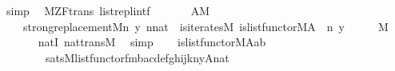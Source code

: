 \begin{isabellebody}
\ simp\isanewline
{}\isamarkupfalse%
%
\endisatagproof
{\isafoldproof}%
%
\isadelimproof
\isanewline
%
\endisadelimproof
\isanewline
\isanewline
{}\isamarkupfalse%
\ {\isacharparenleft}{\kern0pt}\ M{\isacharunderscore}{\kern0pt}ZF{\isacharunderscore}{\kern0pt}trans{\isacharparenright}{\kern0pt}\ list{\isacharunderscore}{\kern0pt}repl{}{\isacharunderscore}{\kern0pt}intf{\isacharcolon}{\kern0pt}\isanewline
\ \ \isanewline
\ \ \ \ {\isachardoublequoteopen}A{\isasymin}M{\isachardoublequoteclose}\isanewline
\ \ \isanewline
\ \ \ \ {\isachardoublequoteopen}strong{\isacharunderscore}{\kern0pt}replacement{\isacharparenleft}{\kern0pt}{\isacharhash}{\kern0pt}{\isacharhash}{\kern0pt}M{\isacharcomma}{\kern0pt}{\isasymlambda}n\ y{\isachardot}{\kern0pt}\ n{\isasymin}nat\ {\isacharampersand}{\kern0pt}\ is{\isacharunderscore}{\kern0pt}iterates{\isacharparenleft}{\kern0pt}{\isacharhash}{\kern0pt}{\isacharhash}{\kern0pt}M{\isacharcomma}{\kern0pt}\ is{\isacharunderscore}{\kern0pt}list{\isacharunderscore}{\kern0pt}functor{\isacharparenleft}{\kern0pt}{\isacharhash}{\kern0pt}{\isacharhash}{\kern0pt}M{\isacharcomma}{\kern0pt}A{\isacharparenright}{\kern0pt}{\isacharcomma}{\kern0pt}\ {}{\isacharcomma}{\kern0pt}\ n{\isacharcomma}{\kern0pt}\ y{\isacharparenright}{\kern0pt}{\isacharparenright}{\kern0pt}{\isachardoublequoteclose}\isanewline
%
\isadelimproof
%
\endisadelimproof
%
\isatagproof
{}\isamarkupfalse%
\ {\isacharminus}{\kern0pt}\isanewline
\ \ \isamarkupfalse%
\ {\isachardoublequoteopen}{}{\isasymin}M{\isachardoublequoteclose}\isanewline
\ \ \ \ \isamarkupfalse%
\ \ nat{\isacharunderscore}{\kern0pt}{}I\ nat{\isacharunderscore}{\kern0pt}trans{\isacharunderscore}{\kern0pt}M\ \isamarkupfalse%
\ simp\isanewline
\ \ \isamarkupfalse%
\ {\isachardoublequoteopen}is{\isacharunderscore}{\kern0pt}list{\isacharunderscore}{\kern0pt}functor{\isacharparenleft}{\kern0pt}{\isacharhash}{\kern0pt}{\isacharhash}{\kern0pt}M{\isacharcomma}{\kern0pt}A{\isacharcomma}{\kern0pt}a{\isacharcomma}{\kern0pt}b{\isacharparenright}{\kern0pt}\ {\isasymlongleftrightarrow}\isanewline
\ \ \ \ \ \ \ \ sats{\isacharparenleft}{\kern0pt}M{\isacharcomma}{\kern0pt}list{\isacharunderscore}{\kern0pt}functor{\isacharunderscore}{\kern0pt}fm{\isacharparenleft}{\kern0pt}{}{}{\isacharcomma}{\kern0pt}{}{\isacharcomma}{\kern0pt}{}{\isacharparenright}{\kern0pt}{\isacharcomma}{\kern0pt}{\isacharbrackleft}{\kern0pt}b{\isacharcomma}{\kern0pt}a{\isacharcomma}{\kern0pt}c{\isacharcomma}{\kern0pt}d{\isacharcomma}{\kern0pt}e{\isacharcomma}{\kern0pt}f{\isacharcomma}{\kern0pt}g{\isacharcomma}{\kern0pt}h{\isacharcomma}{\kern0pt}i{\isacharcomma}{\kern0pt}j{\isacharcomma}{\kern0pt}k{\isacharcomma}{\kern0pt}n{\isacharcomma}{\kern0pt}y{\isacharcomma}{\kern0pt}A{\isacharcomma}{\kern0pt}{}{\isacharcomma}{\kern0pt}nat{\isacharbrackright}{\kern0pt}{\isacharparenright}{\kern0pt}{\isachardoublequoteclose}\isanewline

\end{isabellebody}
